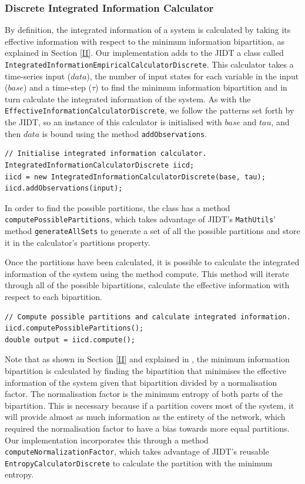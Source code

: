 \documentclass[a4paper,11pt]{article}
\begin{document}
\subsubsection{Discrete Integrated Information Calculator}

By definition, the integrated information of a system is calculated by taking its effective information with respect to the minimum information bipartition, as explained in Section \ref{II}. Our implementation adds to the JIDT a class called \texttt{IntegratedInformationEmpiricalCalculatorDiscrete}. This calculator takes a time-series input ($data$), the number of input states for each variable in the input ($base$) and a time-step ($\tau$) to find the minimum information bipartition and in turn calculate the integrated information of the system. As with the \texttt{EffectiveInformationCalculatorDiscrete}, we follow the patterns set forth by the JIDT, so an instance of this calculator is initialised with $base$ and $tau$, and then $data$ is bound using the method \texttt{addObservations}.

\begin{verbatim}
// Initialise integrated information calculator.
IntegratedInformationCalculatorDiscrete iicd;
iicd = new IntegratedInformationCalculatorDiscrete(base, tau);
iicd.addObservations(input);
\end{verbatim}

In order to find the possible partitions, the class has a method \texttt{computePossiblePartitions}, which takes advantage of JIDT's \texttt{MathUtils}' method \texttt{generateAllSets} to generate a set of all the possible partitions and store it in the calculator's partitions property.

Once the partitions have been calculated, it is possible to calculate the integrated information of the system using the method compute. This method will iterate through all of the possible bipartitions, calculate the effective information with respect to each bipartition.

\begin{verbatim}
// Compute possible partitions and calculate integrated information.
iicd.computePossiblePartitions();
double output = iicd.compute();
\end{verbatim}

Note that as shown in Section \ref{II} and explained in \cite{Barrett2011}, the minimum information bipartition is calculated by finding the bipartition that minimises the effective information of the system given that bipartition divided by a normalisation factor. The normalisation factor is the minimum entropy of both parts of the bipartition. This is necessary because if a partition covers most of the system, it will provide almost as much information as the entirety of the network, which required the normalisation factor to have a bias towards more equal partitions. Our implementation incorporates this through a method \texttt{computeNormalizationFactor}, which takes advantage of JIDT's reusable \texttt{EntropyCalculatorDiscrete} to calculate the partition with the minimum entropy.
\end{document}
